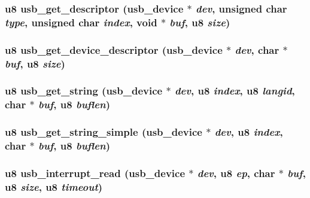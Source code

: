 \subsubsection{\setlength{\rightskip}{0pt plus 5cm}u8 usb\_\-get\_\-descriptor ({\bf usb\_\-device} $\ast$ {\em dev}, unsigned char {\em type}, unsigned char {\em index}, void $\ast$ {\em buf}, u8 {\em size})}\label{usb_8c_c018ca15172cdaf5e46cb88eadee6de2}


\subsubsection{\setlength{\rightskip}{0pt plus 5cm}u8 usb\_\-get\_\-device\_\-descriptor ({\bf usb\_\-device} $\ast$ {\em dev}, char $\ast$ {\em buf}, u8 {\em size})}\label{usb_8c_30772d3ad0aab2e7185c3678c95cc604}


\subsubsection{\setlength{\rightskip}{0pt plus 5cm}u8 usb\_\-get\_\-string ({\bf usb\_\-device} $\ast$ {\em dev}, u8 {\em index}, u8 {\em langid}, char $\ast$ {\em buf}, u8 {\em buflen})}\label{usb_8c_5ebf547e758584cccc3d12def6b2706a}


\subsubsection{\setlength{\rightskip}{0pt plus 5cm}u8 usb\_\-get\_\-string\_\-simple ({\bf usb\_\-device} $\ast$ {\em dev}, u8 {\em index}, char $\ast$ {\em buf}, u8 {\em buflen})}\label{usb_8c_c724192e64a16676a38f9a84c6e0a657}


\subsubsection{\setlength{\rightskip}{0pt plus 5cm}u8 usb\_\-interrupt\_\-read ({\bf usb\_\-device} $\ast$ {\em dev}, u8 {\em ep}, char $\ast$ {\em buf}, u8 {\em size}, u8 {\em timeout})}\label{usb_8c_9b4c0cd9e239df681a165f1890efd165}


